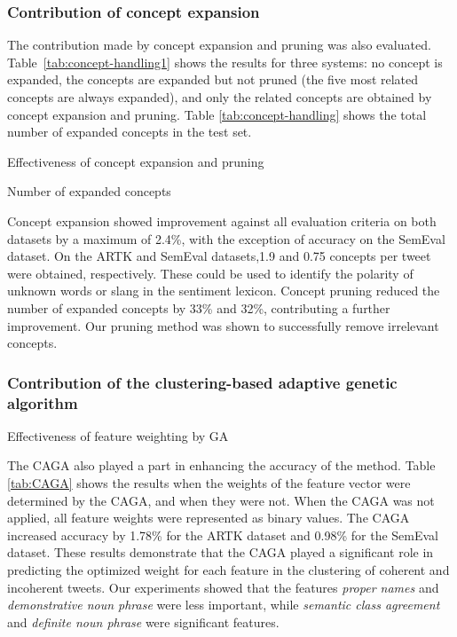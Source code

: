 \documentclass[english]{jnlp_1.4}
\begin{document}
\subsubsection{Contribution of concept expansion}

The contribution made by concept expansion and pruning was also evaluated.
Table~\ref{tab:concept-handling1} shows the results for three systems: no concept is expanded, the concepts are expanded but not pruned (the five most related concepts are always expanded), and only the related concepts are obtained by concept expansion and pruning.
Table \ref{tab:concept-handling} shows the total number of expanded concepts in the test set.

\begin{table}[b]
\caption{Effectiveness of concept expansion and pruning}
\label{tab:concept-handling1}

\end{table}
\begin{table}[b]
\caption{Number of expanded concepts}
\label{tab:concept-handling}

\end{table}

Concept expansion showed improvement against all evaluation criteria on both datasets by a maximum of 2.4\%, with the exception of accuracy on the SemEval dataset.
On the ARTK and SemEval datasets,1.9 and 0.75 concepts per tweet were obtained, respectively.
These could be used to identify the polarity of unknown words or slang in the sentiment lexicon.
Concept pruning reduced the number of expanded concepts by 33\% and 32\%, contributing a further improvement.
Our pruning method was shown to successfully remove irrelevant concepts.


\subsubsection{Contribution of the clustering-based adaptive genetic algorithm}

\begin{table}[b]
\caption{Effectiveness of feature weighting by GA}
\label{tab:CAGA}

\end{table}

The CAGA also played a part in enhancing the accuracy of the method.
Table \ref{tab:CAGA} shows the results when the weights of the feature vector were determined by the CAGA, and when they were not.
When the CAGA was not applied, all feature weights were represented as binary values.
The CAGA increased accuracy by 1.78\% for the ARTK dataset and 0.98\% for the SemEval dataset.
These results demonstrate that the CAGA played a significant role in predicting the optimized weight for each feature in the clustering of coherent and incoherent tweets.
Our experiments showed that the features \textit{proper names} and \textit{demonstrative noun phrase} were less important, while \textit{semantic class agreement} and \textit{definite noun phrase} were significant features.
\end{document}

